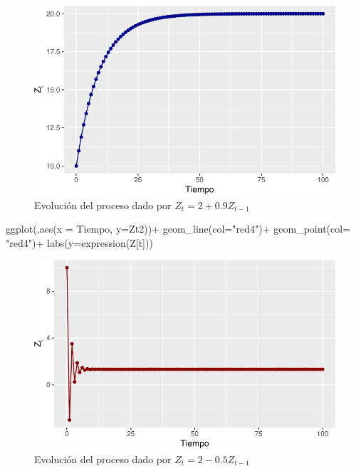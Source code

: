 \documentclass[
  a4paper,
]{article}
\newenvironment{Shaded}{}{}
\newcommand{\AttributeTok}[1]{\textcolor[rgb]{0.84,0.23,0.29}{#1}}
\newcommand{\FunctionTok}[1]{\textcolor[rgb]{0.44,0.26,0.76}{#1}}
\newcommand{\NormalTok}[1]{\textcolor[rgb]{0.14,0.16,0.18}{#1}}
\newcommand{\SpecialCharTok}[1]{\textcolor[rgb]{0.00,0.36,0.77}{#1}}
\newcommand{\StringTok}[1]{\textcolor[rgb]{0.01,0.18,0.38}{#1}}
\begin{document}
\begin{figure}[H]

\caption{\label{fig-fig21}Evolución del proceso dado por
\(Z_t =2+0.9Z_{t-1}\)}

{\centering \includegraphics{index_files/figure-pdf/fig-fig21-1.pdf}

}

\end{figure}

\begin{Shaded}
\begin{Highlighting}[]
\FunctionTok{ggplot}\NormalTok{(,}\FunctionTok{aes}\NormalTok{(}\AttributeTok{x =}\NormalTok{ Tiempo, }\AttributeTok{y=}\NormalTok{Zt2))}\SpecialCharTok{+}
  \FunctionTok{geom\_line}\NormalTok{(}\AttributeTok{col=}\StringTok{"red4"}\NormalTok{)}\SpecialCharTok{+}
  \FunctionTok{geom\_point}\NormalTok{(}\AttributeTok{col=} \StringTok{"red4"}\NormalTok{)}\SpecialCharTok{+}
  \FunctionTok{labs}\NormalTok{(}\AttributeTok{y=}\FunctionTok{expression}\NormalTok{(Z[t]))}
\end{Highlighting}
\end{Shaded}

\begin{figure}[H]

\caption{\label{fig-fig22}Evolución del proceso dado por
\(Z_t =2-0.5Z_{t-1}\)}

{\centering \includegraphics{index_files/figure-pdf/fig-fig22-1.pdf}

}

\end{figure}
\end{document}
